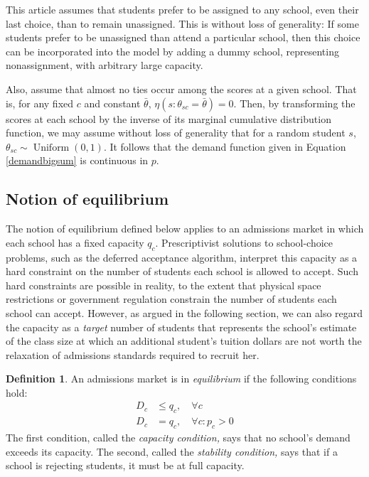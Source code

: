 \documentclass[12pt]{article}
\numberwithin{equation}{subsection}
\theoremstyle{definition}
\newtheorem{definition}{Definition}
\begin{document}
This article assumes that students prefer to be assigned to any school, even their last choice, than to remain unassigned. This is without loss of generality: If some students prefer to be unassigned than attend a particular school, then this choice can be incorporated into the model by adding a dummy school, representing nonassignment, with arbitrary large capacity.

Also, assume that almost no ties occur among the scores at a given school. That is, for any fixed $c$ and constant $\bar \theta$, $\eta( s: \theta_{sc} = \bar \theta) = 0$. Then, by transforming the scores at each school by the inverse of its marginal cumulative distribution function, we may assume without loss of generality that for a random student $s$, $\theta_{sc} \sim \operatorname{Uniform}(0, 1)$. It follows that the demand function given in Equation \eqref{demandbigsum} is continuous in $p$. 

\subsection{Notion of equilibrium}
The notion of equilibrium defined below applies to an admissions market in which each school has a fixed capacity $q_c$. Prescriptivist solutions to school-choice problems, such as the deferred acceptance algorithm, interpret this capacity as a hard constraint on the number of students each school is allowed to accept. Such hard constraints are possible in reality, to the extent that physical space restrictions or government regulation constrain the number of students each school can accept. However, as argued in the following section, we can also regard the capacity as a \emph{target} number of students that represents the school's estimate of the class size at which an additional student's tuition dollars are not worth the relaxation of admissions standards required to recruit her.

\begin{definition} \label{marketeqconditions} An admissions market is in \emph{equilibrium} if the following conditions hold:
\begin{align} D_c &\leq q_c, \quad \forall c \label{capacitycondition} \\
D_c &= q_c, \quad \forall c: p_c > 0 \label{stabilitycondition}
\end{align}
The first condition, called the \emph{capacity condition,} says that no school's demand exceeds its capacity. The second, called the \emph{stability condition,} says that if a school is rejecting students, it must be at full capacity.
\end{definition}
\end{document}
